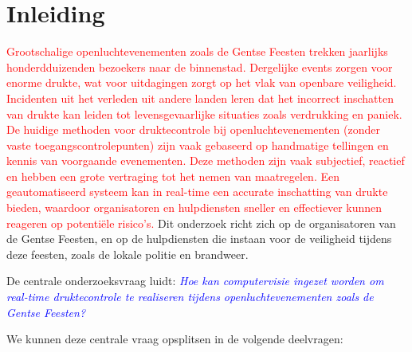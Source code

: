 


% 

\section{Inleiding}%
\label{sec:inleiding}

\textcolor{red}{
  Grootschalige openluchtevenementen zoals de Gentse Feesten trekken jaarlijks hon\-derd\-dui\-zen\-den bezoekers naar de binnenstad. Dergelijke events zorgen voor enorme drukte, wat voor uitdagingen zorgt op het vlak van openbare veiligheid. Incidenten uit het verleden uit andere landen leren dat het incorrect inschatten van drukte kan leiden tot levensgevaarlijke situaties zoals verdrukking en paniek.
  De huidige methoden voor druktecontrole bij openluchtevenementen (zonder vaste toegangscontrolepunten) zijn vaak gebaseerd op handmatige tellingen en kennis van voorgaande evenementen. Deze methoden zijn vaak subjectief, reactief en hebben een grote vertraging tot het nemen van maatregelen. Een geautomatiseerd systeem kan in real-time een accurate inschatting van drukte bieden, waardoor organisatoren en hulpdiensten sneller en effectiever kunnen reageren op potentiële risico's.
}
Dit onderzoek richt zich op de organisatoren van de Gentse Feesten, en op de hulpdiensten die instaan voor de veiligheid tijdens deze feesten, zoals de lokale politie en brandweer.

De centrale onderzoeksvraag luidt: \textcolor{blue}{\emph{Hoe kan computervisie ingezet worden om real-time druk\-te\-con\-tro\-le te realiseren tijdens openluchtevenementen zoals de Gentse Feesten?}}

We kunnen deze centrale vraag opsplitsen in de volgende deelvragen:

